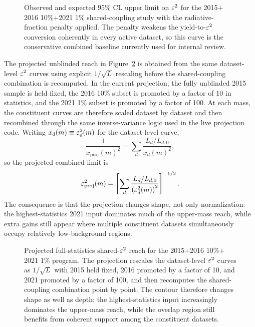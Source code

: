 \begin{figure}[H]
\centering
{}
\caption{Observed and expected 95\% CL upper limit on $\varepsilon^2$ for the
2015$+$2016 10\%$+$2021 1\% shared-coupling study with the radiative-fraction penalty
applied. The penalty weakens the yield-to-$\varepsilon^2$ conversion coherently in every
active dataset, so this curve is the conservative combined baseline currently used for
internal review.}
\label{fig:results-combined-151621-1pct-ul}
\end{figure}

The projected unblinded reach in Figure~\ref{fig:results-combined-151621-1pct-projection}
is obtained from the same dataset-level $\varepsilon^2$ curves using explicit
$1/\sqrt{L}$ rescaling before the shared-coupling combination is recomputed. In the
current projection, the fully unblinded 2015 sample is held fixed, the 2016 10\%
subset is promoted by a factor of 10 in statistics, and the 2021 1\% subset is
promoted by a factor of 100. At each mass, the constituent curves are therefore scaled
dataset by dataset and then recombined through the same inverse-variance logic used in
the live projection code. Writing $x_d(m)\equiv\varepsilon^2_d(m)$ for the dataset-level
curve,
\begin{equation}
\frac{1}{x_{\mathrm{proj}}(m)^2}
=
\sum_d \frac{L_d/L_{d,0}}{x_d(m)^2},
\end{equation}
so the projected combined limit is
\begin{equation}
\varepsilon^2_{\mathrm{proj}}(m) = \left[\sum_d
\frac{L_d/L_{d,0}}{\left(\varepsilon^2_d(m)\right)^2}\right]^{-1/2}.
\end{equation}
The consequence is that the projection changes shape, not only normalization: the
highest-statistics 2021 input dominates much of the upper-mass reach, while extra gains
still appear where multiple constituent datasets simultaneously occupy relatively
low-background regions.

\begin{figure}[H]
\centering
{}
\caption{Projected full-statistics shared-$\varepsilon^2$ reach for the
2015$+$2016 10\%$+$2021 1\% program. The projection rescales the dataset-level
$\varepsilon^2$ curves as $1/\sqrt{L}$ with 2015 held fixed, 2016 promoted by a factor of 10,
and 2021 promoted by a factor of 100, and then recomputes the shared-coupling
combination point by point. The contour therefore changes shape as well as depth:
the highest-statistics input increasingly dominates the upper-mass reach, while the
overlap region still benefits from coherent support among the constituent datasets.}
\label{fig:results-combined-151621-1pct-projection}
\end{figure}

